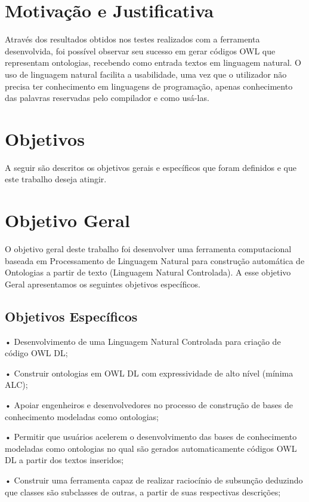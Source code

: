 \documentclass{bcc}
\begin{document}
\section{Motivação e Justificativa}

Através dos resultados obtidos nos testes realizados com a ferramenta desenvolvida, foi possível observar seu sucesso em gerar códigos OWL que representam ontologias, recebendo como entrada textos em linguagem natural. O uso de linguagem natural facilita a usabilidade, uma vez que o utilizador não precisa ter conhecimento em linguagens de programação, apenas conhecimento das palavras reservadas pelo compilador e como usá-las.



\section{Objetivos}

A seguir são descritos os objetivos gerais e específicos que foram definidos e que este trabalho deseja atingir.

\section{Objetivo Geral}
O objetivo geral deste trabalho foi desenvolver uma ferramenta computacional baseada em Processamento de Linguagem Natural para construção automática de Ontologias a partir de texto (Linguagem Natural Controlada). A esse objetivo Geral apresentamos os seguintes objetivos específicos.

\subsection{Objetivos Específicos}
•	Desenvolvimento de uma Linguagem Natural Controlada para criação de código OWL DL;

•	Construir ontologias em OWL DL com expressividade de alto nível (mínima ALC);

•	Apoiar engenheiros e desenvolvedores no processo de construção de bases de conhecimento modeladas como ontologias;

•	Permitir que usuários acelerem o desenvolvimento das bases de conhecimento modeladas como ontologias no qual são gerados automaticamente códigos OWL DL a partir dos textos inseridos;

•	Construir uma ferramenta capaz de realizar raciocínio de subsunção deduzindo que classes são subclasses de outras, a partir de suas respectivas descrições;
\end{document}
